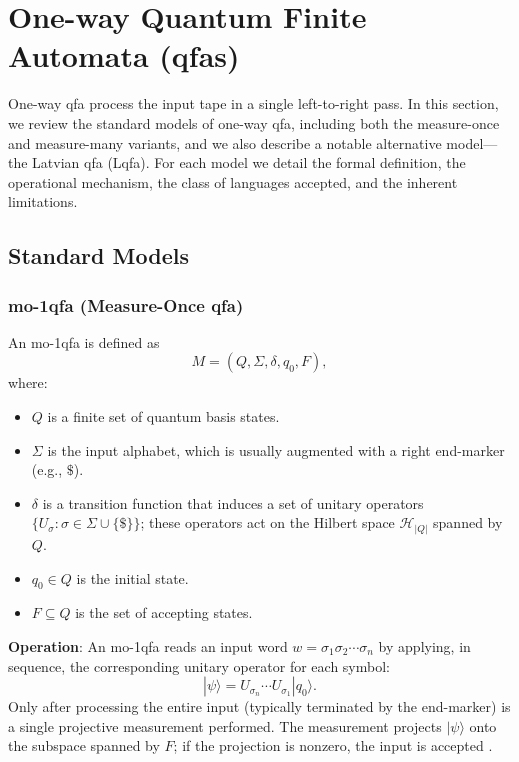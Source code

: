 
\section{One-way Quantum Finite Automata (qfas)}
\label{sec:one-way-qfas}

One-way \gls{qfa} process the input tape in a single left-to-right pass. In this section, we review the standard models of one-way \gls{qfa}, including both the measure-once and measure-many variants, and we also describe a notable alternative model—the Latvian \gls{qfa} (Lqfa). For each model we detail the formal definition, the operational mechanism, the class of languages accepted, and the inherent limitations.

\subsection{Standard Models}
\label{subsec:standard-models}

\subsubsection{mo-1qfa (Measure-Once qfa)}
\label{sssec:mo-1qfa}
\begin{definition}[mo-1qfa]
An \gls{mo-1qfa} is defined as 
\[
M = (Q, \Sigma, \delta, q_0, F),
\]
where:
\begin{itemize}
    \item \( Q \) is a finite set of quantum basis states.
    \item \( \Sigma \) is the input alphabet, which is usually augmented with a right end-marker (e.g., \( \$ \)).
    \item \( \delta \) is a transition function that induces a set of unitary operators \( \{ U_\sigma : \sigma \in \Sigma \cup \{\$\} \} \); these operators act on the Hilbert space \( \mathcal{H}_{|Q|} \) spanned by \( Q \).
    \item \( q_0 \in Q \) is the initial state.
    \item \( F \subseteq Q \) is the set of accepting states.
\end{itemize}
\end{definition}

\textbf{Operation}:  
An \gls{mo-1qfa} reads an input word \( w = \sigma_1\sigma_2\cdots\sigma_n \) by applying, in sequence, the corresponding unitary operator for each symbol:
\[
|\psi\rangle = U_{\sigma_n} \cdots U_{\sigma_1} |q_0\rangle.
\]
Only after processing the entire input (typically terminated by the end-marker) is a single projective measurement performed. The measurement projects \( |\psi\rangle \) onto the subspace spanned by \( F \); if the projection is nonzero, the input is accepted \cite{moore2000quantum,bertoni2001regular}.

